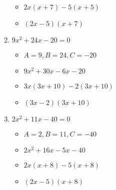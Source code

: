 \documentclass{article}
\begin{document}
\begin{enumerate}
\begin{itemize}
  \item $2x(x+7)-5(x+5)$
  \item $(2x-5)(x+7)$
  \end{itemize}
\item $9x^{2} + 24x - 20 = 0$
  \begin{itemize}
  \item $A=9, B=24, C=-20$
  \item $9x^{2}+30x-6x-20$
  \item $3x(3x+10)-2(3x+10)$
  \item $(3x-2)(3x+10)$
  \end{itemize}
\item $2x^{2} + 11x - 40 = 0$
  \begin{itemize}
  \item $A=2, B=11, C=-40$
  \item $2x^{2}+16x-5x-40$
  \item $2x(x+8)-5(x+8)$
  \item $(2x-5)(x+8)$
  \end{itemize}
\end{enumerate}
\end{document}
